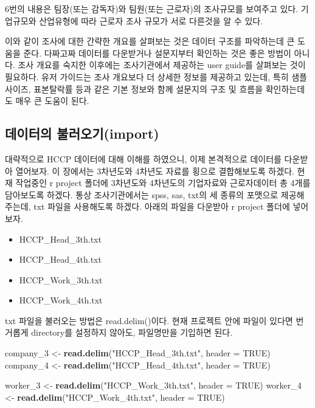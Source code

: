 \documentclass[
]{book}
\newenvironment{Shaded}{\begin{snugshade}}{\end{snugshade}}
\newcommand{\AttributeTok}[1]{\textcolor[rgb]{0.13,0.29,0.53}{#1}}
\newcommand{\ConstantTok}[1]{\textcolor[rgb]{0.56,0.35,0.01}{#1}}
\newcommand{\FunctionTok}[1]{\textcolor[rgb]{0.13,0.29,0.53}{\textbf{#1}}}
\newcommand{\NormalTok}[1]{#1}
\newcommand{\OtherTok}[1]{\textcolor[rgb]{0.56,0.35,0.01}{#1}}
\newcommand{\StringTok}[1]{\textcolor[rgb]{0.31,0.60,0.02}{#1}}
\providecommand{\tightlist}{%
  \setlength{\itemsep}{0pt}\setlength{\parskip}{0pt}}
\begin{document}
6번의 내용은 팀장(또는 감독자)와 팀원(또는 근로자)의 조사규모를 보여주고 있다. 기업규모와 산업유형에 따라 근로자 조사 규모가 서로 다른것을 알 수 있다.

이와 같이 조사에 대한 간략한 개요를 살펴보는 것은 데이터 구조를 파악하는데 큰 도움을 준다. 다짜고짜 데이터를 다운받거나 설문지부터 확인하는 것은 좋은 방법이 아니다. 조사 개요를 숙지한 이후에는 조사기관에서 제공하는 user guide를 살펴보는 것이 필요하다. 유저 가이드는 조사 개요보다 더 상세한 정보를 제공하고 있는데, 특히 샘플 사이즈, 표본탈락률 등과 같은 기본 정보와 함께 설문지의 구조 및 흐름을 확인하는데도 매우 큰 도움이 된다.

\subsection{데이터의 불러오기(import)}\label{uxb370uxc774uxd130uxc758-uxbd88uxb7ecuxc624uxae30import}

대략적으로 HCCP 데이터에 대해 이해를 하였으니, 이제 본격적으로 데이터를 다운받아 열어보자. 이 장에서는
3차년도와 4차년도 자료를 횡으로 결합해보도록 하겠다. 현재 작업중인 r project 폴더에 3차년도와 4차년도의 기업자료와 근로자데이터 총 4개를 담아보도록 하겠다. 통상 조사기관에서는 spss, sas, txt의 세 종류의 포맷으로 제공해주는데, txt 파일을 사용해도록 하겠다. 아래의 파일을 다운받아 r project 폴더에 넣어보자.

\begin{itemize}
\tightlist
\item
  HCCP\_Head\_3th.txt
\item
  HCCP\_Head\_4th.txt
\item
  HCCP\_Work\_3th.txt
\item
  HCCP\_Work\_4th.txt
\end{itemize}

txt 파일을 불러오는 방법은 read.delim()이다. 현재 프로젝트 안에 파일이 있다면 번거롭게 directory를 설정하지 않아도, 파일명만을 기입하면 된다.

\begin{Shaded}
\begin{Highlighting}[]
\NormalTok{company\_3 }\OtherTok{\textless{}{-}} \FunctionTok{read.delim}\NormalTok{(}\StringTok{"HCCP\_Head\_3th.txt"}\NormalTok{, }\AttributeTok{header =} \ConstantTok{TRUE}\NormalTok{)}
\NormalTok{company\_4 }\OtherTok{\textless{}{-}} \FunctionTok{read.delim}\NormalTok{(}\StringTok{"HCCP\_Head\_4th.txt"}\NormalTok{, }\AttributeTok{header =} \ConstantTok{TRUE}\NormalTok{)}

\NormalTok{worker\_3 }\OtherTok{\textless{}{-}} \FunctionTok{read.delim}\NormalTok{(}\StringTok{"HCCP\_Work\_3th.txt"}\NormalTok{, }\AttributeTok{header =} \ConstantTok{TRUE}\NormalTok{)}
\NormalTok{worker\_4 }\OtherTok{\textless{}{-}} \FunctionTok{read.delim}\NormalTok{(}\StringTok{"HCCP\_Work\_4th.txt"}\NormalTok{, }\AttributeTok{header =} \ConstantTok{TRUE}\NormalTok{)}
\end{Highlighting}
\end{Shaded}
\end{document}
